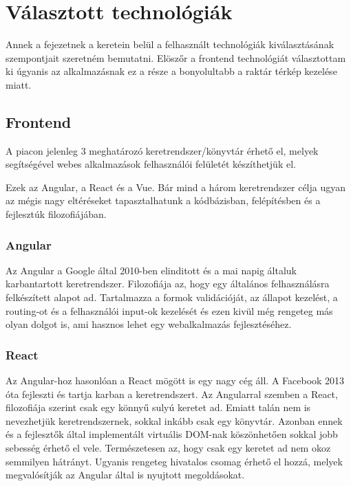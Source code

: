 \chapter{Választott technológiák}

Annek a fejezetnek a keretein belül a felhasznált technológiák kiválasztásának szempontjait szeretném bemutatni. 
Elöszőr a frontend technológiát választottam ki úgyanis az alkalmazásnak ez a része a bonyolultabb a raktár térkép kezelése miatt.

\section{Frontend}

A piacon jelenleg 3 meghatározó keretrendszer/könyvtár érhető el, melyek segítségével webes alkalmazások felhasználói felületét készíthetjük el.

Ezek az Angular, a React és a Vue. 
Bár mind a három keretrendszer célja ugyan az mégis nagy eltéréseket tapasztalhatunk a kódbázisban, felépítésben és a fejlesztúk filozofiájában.

\subsection{Angular}
Az Angular a Google által 2010-ben elinditott és a mai napig általuk karbantartott keretrendszer.
Filozofiája az, hogy egy általános felhasználásra felkészített alapot ad. 
Tartalmazza a formok validációját, az állapot kezelést, a routing-ot és a felhasználói input-ok kezelését és ezen kivül még rengeteg más olyan dolgot is, ami hasznos lehet egy webalkalmazás fejlesztéséhez.

\subsection{React}
Az Angular-hoz hasonlóan a React mögött is egy nagy cég áll.
A Facebook 2013 óta fejleszti és tartja karban a keretrendszert.
Az Angularral szemben a React, filozofiája szerint csak egy könnyű sulyú keretet ad. 
Emiatt talán nem is nevezhetjük keretrendszernek, sokkal inkább csak egy könyvtár. 
Azonban ennek és a fejlesztők által implementált virtuális DOM-nak köszönhetően sokkal jobb sebesség érhető el vele.
Természetesen az, hogy csak egy keretet ad nem okoz semmilyen hátrányt.
Ugyanis rengeteg hivatalos csomag érhető el hozzá, melyek megvalósítják az Angular által is nyujtott megoldásokat.

